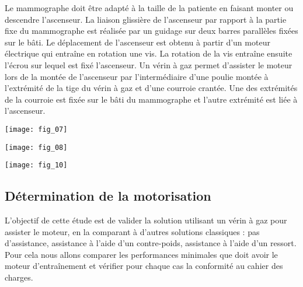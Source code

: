 Le mammographe doit être adapté à la taille de la patiente en faisant monter
ou descendre l’ascenseur. La liaison glissière de l’ascenseur par rapport à la partie
fixe du mammographe est réalisée par un guidage sur deux barres parallèles
fixées sur le bâti. Le déplacement de l’ascenseur est obtenu à partir d’un moteur
électrique qui entraîne en rotation une vis. La rotation de la vis entraîne ensuite
l’écrou sur lequel est fixé l’ascenseur.
Un vérin à gaz permet d’assister le moteur lors de la montée de l’ascenseur par
l’intermédiaire d’une poulie montée à l’extrémité de la tige du vérin à gaz et
d’une courroie crantée. Une des extrémités de la courroie est fixée sur le bâti du
mammographe et l’autre extrémité est liée à l’ascenseur.

\begin{marginfigure}
\texttt{[image: fig\_07]}
\end{marginfigure}

\begin{marginfigure}
\texttt{[image: fig\_08]}
\end{marginfigure}

\begin{marginfigure}
\texttt{[image: fig\_10]}
\end{marginfigure}

\fi

%

\subsection*{Détermination de la motorisation}
\begin{obj}
L’objectif de cette étude est de valider la solution utilisant un vérin à gaz
pour assister le moteur, en la comparant à d’autres solutions
classiques : pas d’assistance, assistance à l’aide d’un contre-poids,
assistance à l’aide d’un ressort. Pour cela nous allons comparer les performances
minimales que doit avoir le moteur d’entraînement et vérifier
pour chaque cas la conformité au cahier des charges.
\end{obj}

